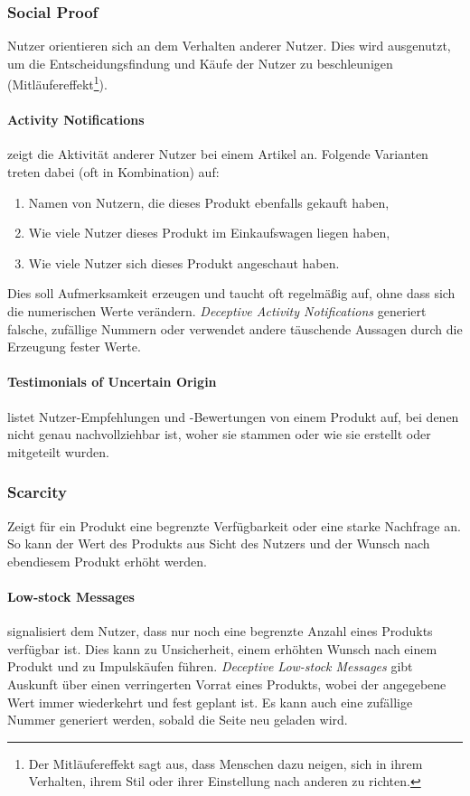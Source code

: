 \documentclass[a4paper]{article}
\begin{document}
\subsubsection{Social Proof}
Nutzer orientieren sich an dem Verhalten anderer Nutzer. Dies wird ausgenutzt, um die Entscheidungsfindung und Käufe der Nutzer zu beschleunigen (Mitläufereffekt\footnote{\label{foot:5} Der Mitläufereffekt sagt aus, dass Menschen dazu neigen, sich in ihrem Verhalten, ihrem Stil oder ihrer Einstellung nach anderen zu richten.}).

\paragraph{Activity Notifications} zeigt die Aktivität anderer Nutzer bei einem Artikel an. Folgende Varianten treten dabei (oft in Kombination) auf: 
\begin{enumerate}[label=\arabic*)]
	\item{Namen von Nutzern, die dieses Produkt ebenfalls gekauft haben,}
	\item{Wie viele Nutzer dieses Produkt im Einkaufswagen liegen haben,}
	\item{Wie viele Nutzer sich dieses Produkt angeschaut haben.}
\end{enumerate}
Dies soll Aufmerksamkeit erzeugen und taucht oft regelmäßig auf, ohne dass sich die numerischen Werte verändern. \textit{Deceptive Activity Notifications} generiert falsche, zufällige Nummern oder verwendet andere täuschende Aussagen durch die Erzeugung fester Werte.

\paragraph{Testimonials of Uncertain Origin} listet Nutzer-Empfehlungen und -Bewertungen von einem Produkt auf, bei denen nicht genau nachvollziehbar ist, woher sie stammen oder wie sie erstellt oder mitgeteilt wurden. 

\subsubsection{Scarcity}
Zeigt für ein Produkt eine begrenzte Verfügbarkeit oder eine starke Nachfrage an. So kann der Wert des Produkts aus Sicht des Nutzers und der Wunsch nach ebendiesem Produkt erhöht werden.

\paragraph{Low-stock Messages} signalisiert dem Nutzer, dass nur noch eine begrenzte Anzahl eines Produkts verfügbar ist. Dies kann zu Unsicherheit, einem erhöhten Wunsch nach einem Produkt und zu Impulskäufen führen. \textit{Deceptive Low-stock Messages} gibt Auskunft über einen verringerten Vorrat eines Produkts, wobei der angegebene Wert immer wiederkehrt und fest geplant ist. Es kann auch eine zufällige Nummer generiert werden, sobald die Seite neu geladen wird. 
\end{document}
